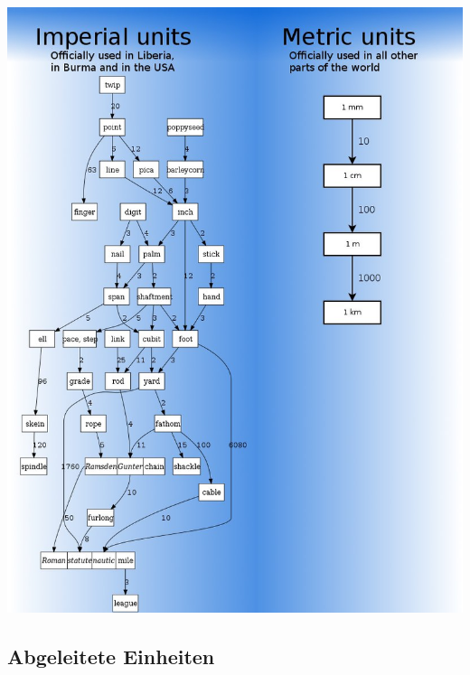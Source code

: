 \begin{frame}

    \begin{center}
        \includegraphics[height=1\textheight]{e01/imperial_vs_metric.jpeg}
        \tiny \hyperlink{refs}{\cite{soup}}
    \end{center}

\end{frame}

\subsection{Abgeleitete Einheiten}

